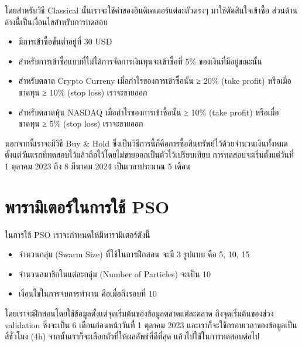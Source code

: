 โดยสำหรับวิธี Classical นั้นเราจะใช้ค่าของอินดิเคเตอร์แต่ละตัวตรงๆ มาใช้ตัดสินใจเข้าซื้อ ส่วนด้านล่างนี้เป็นเงื่อนไขสำหรับการทดสอบ

\begin{itemize}
    \item {มีการเข้าซื้อขั้นต่ำอยู่ที่ 30 USD}
    \item {สำหรับการเข้าซื้อแบบที่ไม่ได้การจัดการเงินทุนจะเข้าซื้อที่ 5\% ของเงินที่มีอยู่ขณะนั้น}
    \item {สำหรับตลาด Crypto Curreny เมื่อกำไรของการเข้าซื้อนั้น ≥ 20\% (take profit) หรือเมื่อขาดทุน ≥ 10\% (stop loss) เราจะขายออก}
    \item {สำหรับตลาดหุ้น NASDAQ เมื่อกำไรของการเข้าซื้อนั้น ≥ 10\% (take profit) หรือเมื่อขาดทุน ≥ 5\% (stop loss) เราจะขายออก}
\end{itemize}
นอกจากนี้เราจะมีวิธี Buy \& Hold ซึ่งเป็นวิธีการนี้ก็คือการซื้อสินทรัพย์ไว้ด้วยจำนวนเงินทั้งหมด ตั้งแต่วันแรกที่ทดสอบไว้แล้วถือไว้โดยไม่ขายออกเป็นตัวไว้เปรียบเทียบ การทดสอบจะเริ่มตั้งแต่วันที่ 1 ตุลาคม 2023 ถึง 8 มีนาคม 2024 เป็นเวลาประมาณ 5 เดือน

\section{พารามิเตอร์ในการใช้ PSO}
ในการใช้ PSO เราจะกำหนดให้มีพารามิเตอร์ตังนี้
\begin{itemize}
    \item {จำนวนกลุ่ม (Swarm Size) ที่ใช้ในการฝึกสอน จะมี 3 รูปแบบ คือ 5, 10, 15}
    \item {จำนวนสมาชิกในแต่ละกลุ่ม (Number of Particles) จะเป็น 10}
    \item {เงื่อนไขในการจบการทำงาน คือเมื่อถึงรอบที่ 10}
\end{itemize}
โดยเราจะฝึกสอนโดยใช้ข้อมูลตั้งแต่จุดเริ่มต้นของข้อมูลตลาดแต่ละตลาด ถึงจุดเริ่มต้นของช่วง validation ซึ่งจะเป็น 6 เดือนก่อนหน้าวันที่ 1 ตุลาคม 2023 และเราก็จะใช้กรอบเวลาของข้อมูลเป็นสี่ชั่วโมง (4h) จากนั้นเราก็จะเลือกตัวที่ให้ผลลัพธ์ที่ดีที่สุด แล้วไปใช้ในการทดสอบต่อไป 

